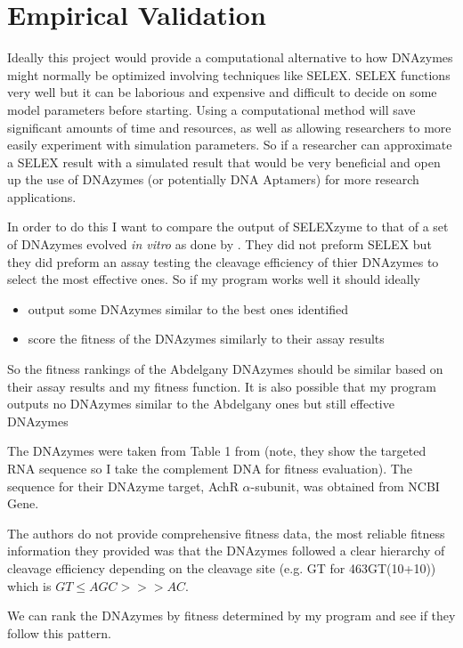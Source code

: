 \documentclass[11pt]{article}
\newcommand{\link}[2]{\href{#1}{\color{linkcolor}\setulcolor{linkcolor}\ul{\mbox{#2}}}}
\begin{document}
\section*{Empirical Validation}
Ideally this project would provide a computational alternative to how DNAzymes might normally be optimized involving techniques like SELEX.
SELEX functions very well but it can be laborious and expensive and difficult to decide on some model parameters before starting.
Using a computational method will save significant amounts of time and resources, as well as allowing researchers to more easily experiment with simulation parameters.
So if a researcher can approximate a SELEX result with a simulated result that would be very beneficial and open up the use of DNAzymes (or potentially DNA Aptamers) for more research applications.

In order to do this I want to compare the output of SELEXzyme to that of a set of DNAzymes evolved \textit{in vitro} as done by \citet{valid}.
They did not preform SELEX but they did preform an assay testing the cleavage efficiency of thier DNAzymes to select the most effective ones.
So if my program works well it should ideally
\begin{itemize}
    \item output some DNAzymes similar to the best ones \citeauthor{valid} identified
    \item score the fitness of the \citeauthor{valid} DNAzymes similarly to their assay results
\end{itemize}

So the fitness rankings of the Abdelgany DNAzymes should be similar based on their assay results and my fitness function.
It is also possible that my program outputs no DNAzymes similar to the Abdelgany ones but still effective DNAzymes

The DNAzymes were taken from Table 1 from \citep{valid} (note, they show the targeted RNA sequence so I take the complement DNA for fitness evaluation).
The sequence for their DNAzyme target, AchR $\alpha$-subunit, was obtained from NCBI Gene.

The authors do not provide comprehensive fitness data, the most reliable fitness information they provided was that the DNAzymes followed a clear hierarchy of cleavage efficiency depending on the cleavage site (e.g. GT for 463GT(10+10)) which is $GT\leq A GC >>> AC$.

We can rank the DNAzymes by fitness determined by my program and see if they follow this pattern.
\end{document}

